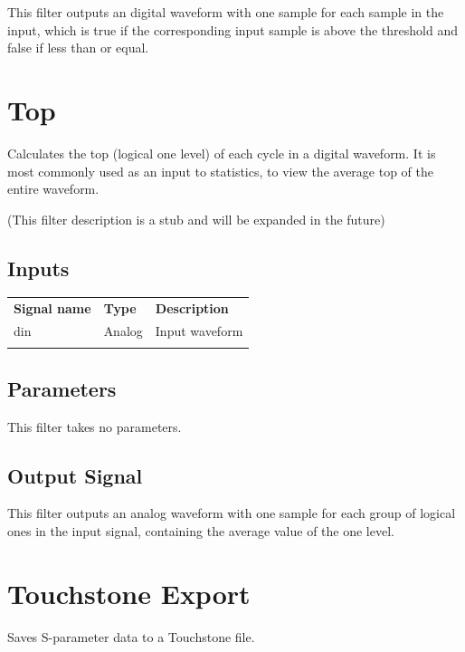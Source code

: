 This filter outputs an digital waveform with one sample for each sample in the input, which is true if the
corresponding input sample is above the threshold and false if less than or equal.

\pagebreak
\section{Top}

Calculates the top (logical one level) of each cycle in a digital waveform. It is most commonly used as an input to
statistics, to view the average top of the entire waveform.

(This filter description is a stub and will be expanded in the future)

\subsection{Inputs}

\begin{tabularx}{16cm}{llX}
\thickhline
\textbf{Signal name} & \textbf{Type} & \textbf{Description} \\
\thickhline
din & Analog & Input waveform \\
\thickhline
\end{tabularx}

\subsection{Parameters}

This filter takes no parameters.

\subsection{Output Signal}

This filter outputs an analog waveform with one sample for each group of logical ones in the input signal, containing
the average value of the one level.

\pagebreak
\section{Touchstone Export}

Saves S-parameter data to a Touchstone file.

